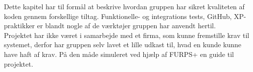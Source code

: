 Dette kapitel har til formål at beskrive hvordan gruppen har sikret kvaliteten af koden gennem forskellige tiltag. 
Funktionelle- og integrations tests, GitHub, XP-praktikker er blandt nogle af de værktøjer gruppen har anvendt hertil. \\

Projektet har ikke været i samarbejde med et firma, som kunne fremstille krav til systemet, 
derfor har gruppen selv lavet et lille udkast til, hvad en kunde kunne have haft af krav. 
På den måde simuleret ved hjælp af FURPS+ en guide til projektet.

